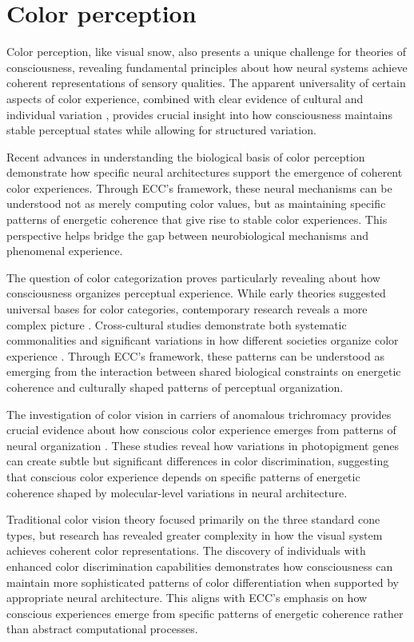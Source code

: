 \section{Color perception}

Color perception, like visual snow, also presents a unique challenge for theories of consciousness, revealing fundamental principles about how neural systems achieve coherent representations of sensory qualities. The apparent universality of certain aspects of color experience, combined with clear evidence of cultural and individual variation \cite{Davidoff2015}, provides crucial insight into how consciousness maintains stable perceptual states while allowing for structured variation.

Recent advances in understanding the biological basis of color perception \cite{ConwayLivingstone2021} demonstrate how specific neural architectures support the emergence of coherent color experiences. Through ECC's framework, these neural mechanisms can be understood not as merely computing color values, but as maintaining specific patterns of energetic coherence that give rise to stable color experiences. This perspective helps bridge the gap between neurobiological mechanisms and phenomenal experience.

The question of color categorization proves particularly revealing about how consciousness organizes perceptual experience. While early theories suggested universal bases for color categories, contemporary research reveals a more complex picture \cite{KayRegier2003}. Cross-cultural studies demonstrate both systematic commonalities and significant variations in how different societies organize color experience \cite{MacLaury1997}. Through ECC's framework, these patterns can be understood as emerging from the interaction between shared biological constraints on energetic coherence and culturally shaped patterns of perceptual organization.

The investigation of color vision in carriers of anomalous trichromacy provides crucial evidence about how conscious color experience emerges from patterns of neural organization \cite{JordanMollon1993}. These studies reveal how variations in photopigment genes can create subtle but significant differences in color discrimination, suggesting that conscious color experience depends on specific patterns of energetic coherence shaped by molecular-level variations in neural architecture.

Traditional color vision theory focused primarily on the three standard cone types, but research has revealed greater complexity in how the visual system achieves coherent color representations. The discovery of individuals with enhanced color discrimination capabilities \cite{Jameson2001} demonstrates how consciousness can maintain more sophisticated patterns of color differentiation when supported by appropriate neural architecture. This aligns with ECC's emphasis on how conscious experiences emerge from specific patterns of energetic coherence rather than abstract computational processes.

